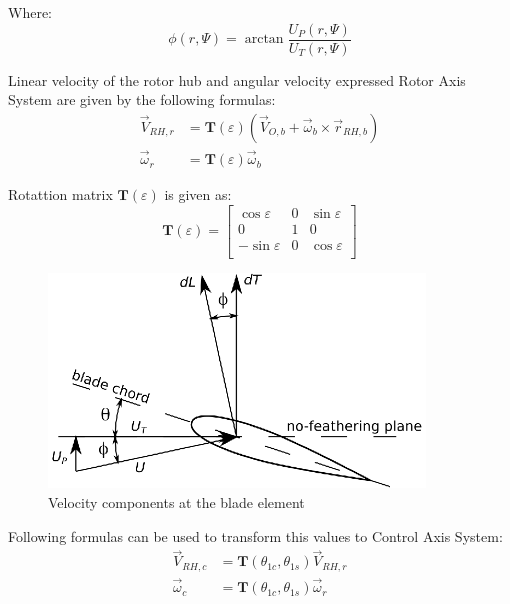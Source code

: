 Where:
\begin{equation}
  \phi \left( r , \Psi \right)
  =
  \arctan \frac{ U_P \left( r, \Psi \right) }{ U_T \left( r, \Psi \right) }
\end{equation}

Linear velocity of the rotor hub and angular velocity expressed Rotor Axis System are given by the following formulas: \cite{Stepniewski1984, Bramwell2001}
\begin{align}
  {\vec V}_{RH,r}
  &=
  {\boldsymbol T} \left( \varepsilon \right)
  \left(
    {\vec V}_{O,b} + {\vec \omega}_b \times {\vec r}_{RH,b}
  \right) \\
  {\vec \omega}_r
  &=
  {\boldsymbol T} \left( \varepsilon \right)
  {\vec \omega}_b
\end{align}

Rotattion matrix ${\boldsymbol T} \left( \varepsilon \right)$ is given as:
\begin{equation}
  {\boldsymbol T} \left( \varepsilon \right)
  =
  \left[
    \begin{matrix}
       \cos \varepsilon & 0 & \sin \varepsilon \\
                        0 & 1 &              0 \\
      -\sin \varepsilon & 0 & \cos \varepsilon \\
    \end{matrix}
  \right]
\end{equation}

\begin{figure}
  \centering
  \includegraphics[width=100mm]{eps/blade_element_theory_02.eps}
  \caption{Velocity components at the blade element}
\end{figure}

Following formulas can be used to transform this values to Control Axis System:
\begin{align}
  {\vec V}_{RH,c} 
  &=
  {\boldsymbol T} \left( \theta_{1c}, \theta_{1s} \right)
  {\vec V}_{RH,r} \\
  {\vec \omega}_c
  &=
  {\boldsymbol T} \left( \theta_{1c}, \theta_{1s} \right)
  {\vec \omega}_r
\end{align}

